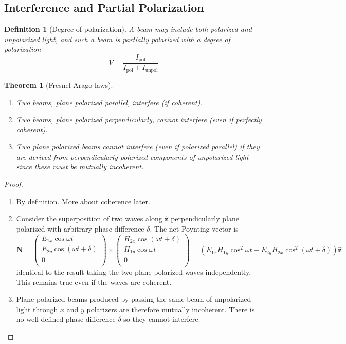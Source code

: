 \documentclass[a4paper]{article}
\theoremstyle{new}
\newtheorem{defi}{Definition}[section]
\newtheorem{thm}{Theorem}[section]
\begin{document}
\subsection{Interference and Partial Polarization}
\begin{defi}[Degree of polarization]
A beam may include both polarized and unpolarized light, and such a beam is partially polarized with a degree of polarization
$$V=\frac{I_{\text{pol}}}{I_{\text{pol}}+I_{\text{unpol}}}$$
\end{defi}
\begin{thm}[Fresnel-Arago laws]\leavevmode
\begin{enumerate}
    \item Two beams, plane polarized parallel, interfere (if coherent).
    \item Two beams, plane polarized perpendicularly, cannot interfere (even if perfectly coherent).
    \item Two plane polarized beams cannot interfere (even if polarized parallel) if they are derived from perpendicularly polarized components of unpolarized light since these must be mutually incoherent.
\end{enumerate}
\end{thm}
\begin{proof}\leavevmode
\begin{enumerate}
    \item By definition. More about coherence later.
    \item Consider the superposition of two waves along $\mathbf{\hat{z}}$ perpendicularly plane polarized with arbitrary phase difference $\delta$. The net Poynting vector is
    $$\mathbf{N}=\begin{pmatrix}E_{1x}\cos\omega t\\E_{2y}\cos(\omega t+\delta)\\0\\\end{pmatrix}\times\begin{pmatrix}H_{2x}\cos(\omega t+\delta)\\H_{1y}\cos\omega t\\0\\\end{pmatrix}=(E_{1x}H_{1y}\cos^2\omega t-E_{2y}H_{2x}\cos^2(\omega t+\delta))\mathbf{\hat{z}}$$
    identical to the result taking the two plane polarized waves independently. This remains true even if the waves are coherent.
    \item Plane polarized beams produced by passing the same beam of unpolarized light through $x$ and $y$ polarizers are therefore mutually incoherent. There is no well-defined phase difference $\delta$ so they cannot interfere.
\end{enumerate}
\end{proof}
\newpage
\end{document}
